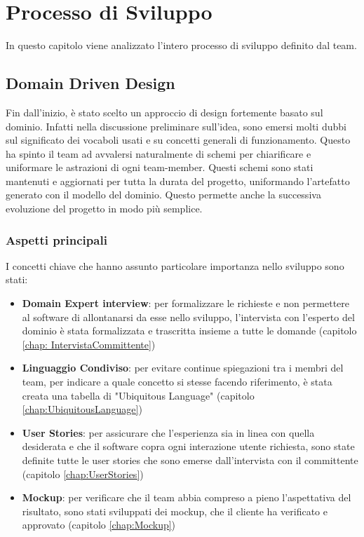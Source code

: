 \chapter{Processo di Sviluppo}
In questo capitolo viene analizzato l'intero processo di sviluppo definito dal team.

\section{Domain Driven Design}
 Fin dall'inizio, è stato scelto un approccio di design fortemente basato sul dominio. Infatti nella discussione preliminare sull'idea, sono emersi molti dubbi sul significato dei vocaboli usati e su concetti generali di funzionamento. Questo ha spinto il team ad avvalersi naturalmente di schemi per chiarificare e uniformare le astrazioni di ogni team-member. Questi schemi sono stati mantenuti e aggiornati per tutta la durata del progetto, uniformando l'artefatto generato con il modello del dominio. Questo permette anche la successiva evoluzione del progetto in modo più semplice.
    \subsection{Aspetti principali}
    I concetti chiave che hanno assunto particolare importanza nello sviluppo sono stati:
    \begin{itemize}
        \item \textbf{Domain Expert interview}: per formalizzare le richieste e non permettere al software di allontanarsi da esse nello sviluppo, l'intervista con l'esperto del dominio è stata formalizzata e trascritta insieme a tutte le domande (capitolo \ref{chap: IntervistaCommittente})
        \item \textbf{Linguaggio Condiviso}: per evitare continue spiegazioni tra i membri del team, per indicare a quale concetto si stesse facendo riferimento, è stata creata una tabella di "Ubiquitous Language" (capitolo \ref{chap:UbiquitousLanguage})
        \item \textbf{User Stories}: per assicurare che l'esperienza sia in linea con quella desiderata e che il software copra ogni interazione utente richiesta, sono state definite tutte le user stories che sono emerse dall'intervista con il committente (capitolo \ref{chap:UserStories})
        \item \textbf{Mockup}: per verificare che il team abbia compreso a pieno l'aspettativa del risultato, sono stati sviluppati dei mockup, che il cliente ha verificato e approvato (capitolo \ref{chap:Mockup})
    \end{itemize}

